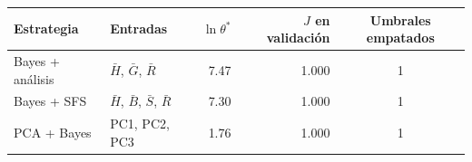 \footnotesize
\begin{tabular}{llrrc}
\toprule
Estrategia & Entradas & $\ln\theta^*$ & $J$ en validación & Umbrales empatados \\
\midrule
Bayes + análisis & $\bar H$, $\bar G$, $\bar R$ & 7.47 & 1.000 & 1 \\
Bayes + SFS & $\bar H$, $\bar B$, $\bar S$, $\bar R$ & 7.30 & 1.000 & 1 \\
PCA + Bayes & PC1, PC2, PC3 & 1.76 & 1.000 & 1 \\
\bottomrule
\end{tabular}
